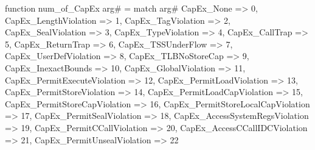 function num_of_CapEx arg# = match arg# {
  CapEx_None => 0,
  CapEx_LengthViolation => 1,
  CapEx_TagViolation => 2,
  CapEx_SealViolation => 3,
  CapEx_TypeViolation => 4,
  CapEx_CallTrap => 5,
  CapEx_ReturnTrap => 6,
  CapEx_TSSUnderFlow => 7,
  CapEx_UserDefViolation => 8,
  CapEx_TLBNoStoreCap => 9,
  CapEx_InexactBounds => 10,
  CapEx_GlobalViolation => 11,
  CapEx_PermitExecuteViolation => 12,
  CapEx_PermitLoadViolation => 13,
  CapEx_PermitStoreViolation => 14,
  CapEx_PermitLoadCapViolation => 15,
  CapEx_PermitStoreCapViolation => 16,
  CapEx_PermitStoreLocalCapViolation => 17,
  CapEx_PermitSealViolation => 18,
  CapEx_AccessSystemRegsViolation => 19,
  CapEx_PermitCCallViolation => 20,
  CapEx_AccessCCallIDCViolation => 21,
  CapEx_PermitUnsealViolation => 22
}
